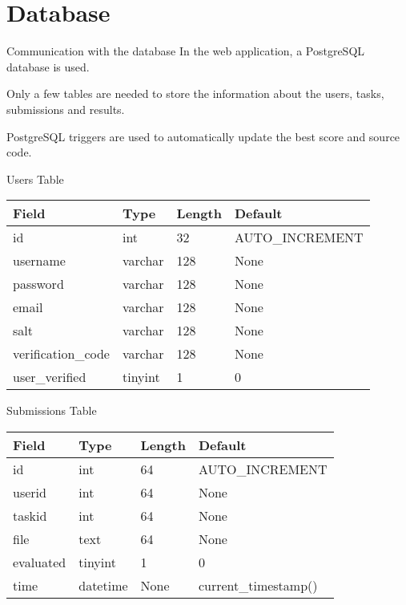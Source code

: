\documentclass{beamer}
\begin{document}
	\begin{frame}[fragile]
		\tiny
		\inputminted{python}{examples/4/app.py}
	\end{frame}

	\section{Database}

	\begin{frame}{Communication with the database}
		In the web application, a PostgreSQL database is used. \par

		Only a few tables are needed to store the information about the users, tasks, submissions and results. \par

		PostgreSQL triggers are used to automatically update the best score and source code. 
	\end{frame}

	\begin{frame}{Users Table}
		\begin{tabular}{|l|l|l|l|}
		\hline
		Field & Type & Length & Default \\
		\hline
		id & int & 32 & AUTO\_INCREMENT \\
		username & varchar & 128 & None \\
		password & varchar & 128 & None \\
		email & varchar & 128 & None \\
		salt & varchar & 128 & None \\
		verification\_code & varchar & 128 & None \\
		user\_verified & tinyint & 1 & 0 \\
		\hline
		\end{tabular}
		\end{frame}

		\begin{frame}{Submissions Table}
			\begin{tabular}{|l|l|l|l|}
			\hline
			Field & Type & Length & Default \\
			\hline
			id & int & 64 & AUTO\_INCREMENT \\
			userid & int & 64 & None \\
			taskid & int & 64 & None \\
			file & text & 64 & None \\
			evaluated & tinyint & 1 & 0 \\
			time & datetime & None & current\_timestamp() \\
			\hline
			\end{tabular}
		\end{frame}
\end{document}

